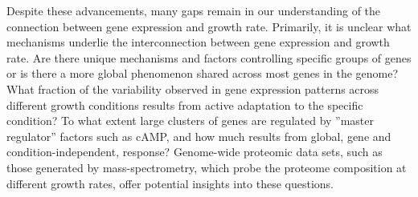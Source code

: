 Despite these advancements, many gaps remain in our understanding of the connection between gene expression and growth rate.
Primarily, it is unclear what mechanisms underlie the interconnection between gene expression and growth rate.
Are there unique mechanisms and factors controlling specific groups of genes or is there a more global phenomenon shared across most genes in the genome?
What fraction of the variability observed in gene expression patterns across different growth conditions results from active adaptation to the specific condition?
To what extent large clusters of genes are regulated by ''master regulator'' factors such as cAMP, and how much results from global, gene and condition-independent, response?
Genome-wide proteomic data sets, such as those generated by mass-spectrometry, which probe the proteome composition at different growth rates, offer potential insights into these questions.